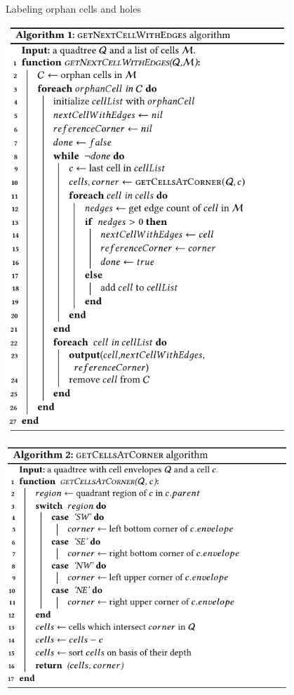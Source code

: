 \documentclass{beamer}
\begin{document}
    \begin{frame}{Labeling orphan cells and holes}
        \begin{minipage}{0.49\textwidth}
            \centering
            \includegraphics[width=0.8\textwidth]{figures/holes3}
        \end{minipage}\hfill %
        \begin{minipage}{0.49\textwidth}
            \centering
            \includegraphics[width=0.8\textwidth]{figures/holes4}
        \end{minipage}
    \end{frame}
    
\end{document}
